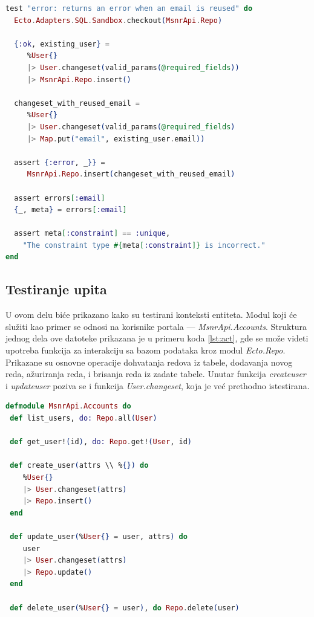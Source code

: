 \documentclass[12pt,oneside]{memoir}
\begin{document}
\begin{minipage}{\linewidth}
\begin{lstlisting}[language=elixir, basicstyle=\small, caption={Test primer neuspešne upotrebe funkcije \emph{changeset/2}, pri narušavanju ograničenja jedinstvenosti},captionpos=b, label={lst:uniq}]
test "error: returns an error when an email is reused" do
  Ecto.Adapters.SQL.Sandbox.checkout(MsnrApi.Repo)

  {:ok, existing_user} =
     %User{}
     |> User.changeset(valid_params(@required_fields))
     |> MsnrApi.Repo.insert()
        
  changeset_with_reused_email =
     %User{}
     |> User.changeset(valid_params(@required_fields)
     |> Map.put("email", existing_user.email))

  assert {:error, _}} =
     MsnrApi.Repo.insert(changeset_with_reused_email)

  assert errors[:email]
  {_, meta} = errors[:email]

  assert meta[:constraint] == :unique,
    "The constraint type #{meta[:constraint]} is incorrect."
end
\end{lstlisting}
\end{minipage}

\subsection{Testiranje upita}
\par U ovom delu biće prikazano kako su testirani konteksti entiteta. Modul koji će služiti kao primer se odnosi na korisnike portala --- \emph{MsnrApi.Accounts}. Struktura jednog dela ove datoteke prikazana je u primeru koda \ref{lst:act}, gde se može videti upotreba funkcija za interakciju sa bazom podataka kroz modul \emph{Ecto.Repo}. Prikazane su osnovne operacije dohvatanja redova iz tabele, dodavanja novog reda, ažuriranja reda, i brisanja reda iz zadate tabele. Unutar funkcija \emph{create{\textunderscore}user} i \emph{update{\textunderscore}user} poziva se i funkcija \emph{User.changeset}, koja je već prethodno istestirana.  \\

\begin{minipage}{\linewidth}
\begin{lstlisting}[language=elixir, basicstyle=\small, caption={Definicija konteksta \emph{MsnrApi.Accounts}},captionpos=b, label={lst:act}]
defmodule MsnrApi.Accounts do
 def list_users, do: Repo.all(User)
  
 def get_user!(id), do: Repo.get!(User, id)

 def create_user(attrs \\ %{}) do
    %User{} 
    |> User.changeset(attrs)
    |> Repo.insert()
 end

 def update_user(%User{} = user, attrs) do
    user 
    |> User.changeset(attrs) 
    |> Repo.update()
 end

 def delete_user(%User{} = user), do Repo.delete(user)
\end{lstlisting}
\end{minipage}
\end{document}
